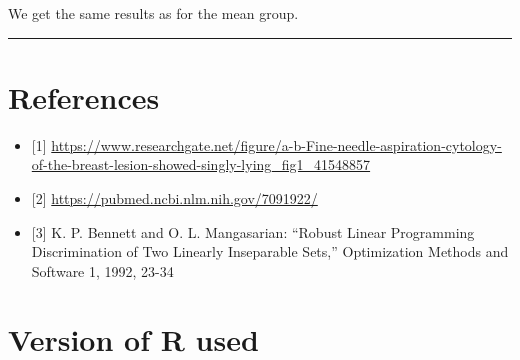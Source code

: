 \documentclass[
  11pt,
]{article}
\providecommand{\tightlist}{%
  \setlength{\itemsep}{0pt}\setlength{\parskip}{0pt}}
\begin{document}
We get the same results as for the mean group.

\begin{center}\rule{0.5\linewidth}{0.5pt}\end{center}

\hypertarget{references}{%
\section{References}\label{references}}

\begin{itemize}
\tightlist
\item
  {[}1{]}
  \url{https://www.researchgate.net/figure/a-b-Fine-needle-aspiration-cytology-of-the-breast-lesion-showed-singly-lying_fig1_41548857}
\item
  {[}2{]} \url{https://pubmed.ncbi.nlm.nih.gov/7091922/}
\item
  {[}3{]} K. P. Bennett and O. L. Mangasarian: ``Robust Linear
  Programming Discrimination of Two Linearly Inseparable Sets,''
  Optimization Methods and Software 1, 1992, 23-34
\end{itemize}

\hypertarget{version-of-r-used}{%
\section{Version of R used}\label{version-of-r-used}}
\end{document}
